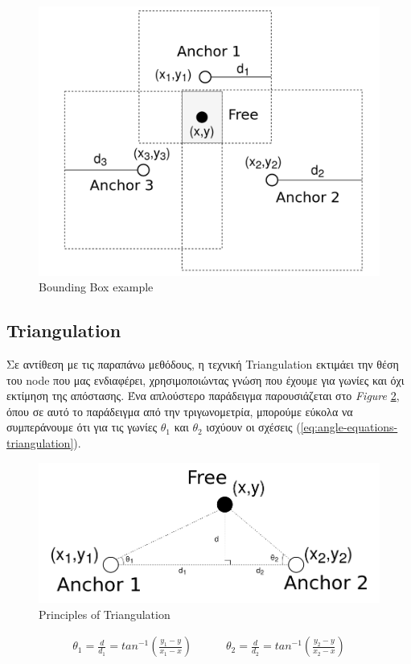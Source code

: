 \begin{figure} [H]
	\centering
	\includegraphics[width=0.5\linewidth]{../Photos/Bounding-box.png}
	\decoRule
	\caption[Bounding Box example]{Bounding Box example}
	\label{fig:Bounding-Box-example}
\end{figure}

\subsection{Triangulation}
Σε αντίθεση με τις παραπάνω μεθόδους, η τεχνική Triangulation εκτιμάει την θέση του node που μας ενδιαφέρει, χρησιμοποιώντας   
γνώση που έχουμε για γωνίες και όχι εκτίμηση της απόστασης. Ένα απλούστερο παράδειγμα παρουσιάζεται στο \emph{Figure} 
\ref{fig:Principles-of-Triangulation}, όπου σε αυτό το παράδειγμα από την τριγωνομετρία,
μπορούμε εύκολα να συμπεράνουμε ότι για τις γωνίες $\theta_1$ και $\theta_2$ ισχύουν οι σχέσεις (\ref{eq:angle-equations-triangulation}).

\begin{figure} [H]
	\centering
	\includegraphics[width=0.5\linewidth]{../Photos/Tringulation-principle.png}
	\decoRule
	\caption[Principles of Triangulation]{Principles of Triangulation}
	\label{fig:Principles-of-Triangulation}
\end{figure}

\begin{align}
	\theta_1 = \frac{d}{d_1} = tan^{-1}\left(\frac{y_1-y}{x_1-x}\right) \quad \quad \quad
	\theta_2 = \frac{d}{d_2} = tan^{-1}\left(\frac{y_2-y}{x_2-x}\right) \label{eq:angle-equations-triangulation}
\end{align}

